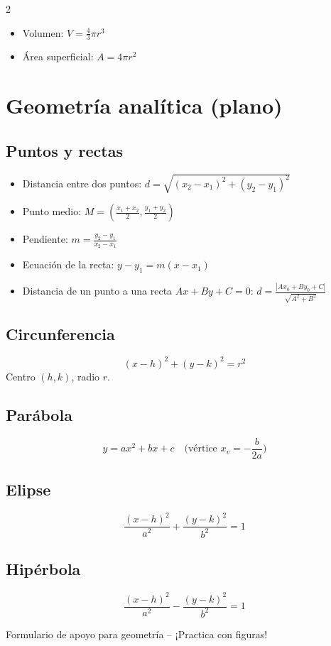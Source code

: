 \documentclass[12pt]{article}
\begin{document}
\begin{multicols}{2}
\begin{itemize}[leftmargin=*]
    \item Volumen: $V = \frac{4}{3}\pi r^3$
    \item Área superficial: $A = 4\pi r^2$
\end{itemize}

\section*{Geometría analítica (plano)}

\subsection*{Puntos y rectas}

\begin{itemize}[leftmargin=*]
    \item Distancia entre dos puntos: $d = \sqrt{(x_2-x_1)^2+(y_2-y_1)^2}$
    \item Punto medio: $M = \left(\frac{x_1+x_2}{2},\frac{y_1+y_2}{2}\right)$
    \item Pendiente: $m = \frac{y_2-y_1}{x_2-x_1}$
    \item Ecuación de la recta: $y-y_1 = m(x-x_1)$
    \item Distancia de un punto a una recta $Ax+By+C=0$: $d = \frac{|Ax_0+By_0+C|}{\sqrt{A^2+B^2}}$
\end{itemize}


\subsection*{Circunferencia}
\[
(x-h)^2 + (y-k)^2 = r^2
\]
Centro $(h,k)$, radio $r$.

\subsection*{Parábola}
\[
y = ax^2+bx+c \quad\text{(vértice } x_v = -\frac{b}{2a}\text{)}
\]

\subsection*{Elipse}
\[
\frac{(x-h)^2}{a^2} + \frac{(y-k)^2}{b^2} = 1
\]

\subsection*{Hipérbola}
\[
\frac{(x-h)^2}{a^2} - \frac{(y-k)^2}{b^2} = 1
\]

\end{multicols}

\vfill
\begin{center}
\small{Formulario de apoyo para geometría -- ¡Practica con figuras!}
\end{center}
\end{document}
